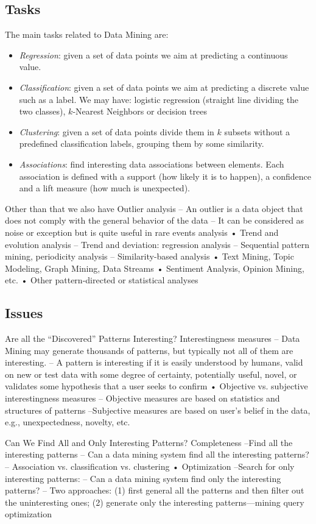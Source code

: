 \subsection{Tasks}
The main tasks related to Data Mining are: 
\begin{itemize}
    \item \textit{Regression}: given a set of data points we aim at predicting a continuous value. 
    \item \textit{Classification}: given a set of data points we aim at predicting a discrete value such as a label. 
        We may have: logistic regression (straight line dividing the two classes), $k$-Nearest Neighbors or decision trees
    \item \textit{Clustering}: given a set of data points divide them in $k$ subsets without a predefined classification labels, grouping them by some similarity. 
    \item \textit{Associations}: find interesting data associations between elements. 
        Each association is defined with a support (how likely it is to happen), a confidence and a lift measure (how much is unexpected). 
\end{itemize}
\noindent Other than that we also have Outlier analysis
– An outlier is a data object that does not comply with the general behavior of the data
– It can be considered as noise or exception but is quite useful in rare events analysis
• Trend and evolution analysis
– Trend and deviation: regression analysis
– Sequential pattern mining, periodicity analysis
– Similarity-based analysis
• Text Mining, Topic Modeling, Graph Mining, Data Streams
• Sentiment Analysis, Opinion Mining, etc.
• Other pattern-directed or statistical analyses

\subsection{Issues}
Are all the “Discovered” Patterns Interesting?
Interestingness measures
– Data Mining may generate thousands of patterns, but typically not all of them are interesting.
– A pattern is interesting if it is easily understood by humans, valid on new or test data with
some degree of certainty, potentially useful, novel, or validates some hypothesis that a user
seeks to confirm
• Objective vs. subjective interestingness measures
– Objective measures are based on statistics and structures of patterns
–Subjective measures are based on user’s belief in the data, e.g., unexpectedness, novelty, etc.

Can We Find All and Only Interesting Patterns?
Completeness
–Find all the interesting patterns
– Can a data mining system find all
the interesting patterns?
– Association vs. classification vs. clustering
• Optimization
–Search for only interesting patterns:
– Can a data mining system find only
the interesting patterns?
– Two approaches: (1) first general all the patterns and then filter out the uninteresting ones;
(2) generate only the interesting patterns—mining query optimization